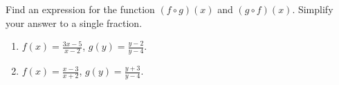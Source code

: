 Find an expression for the function $(f\circ g)(x)$ and $(g\circ f)(x)$. Simplify your answer to a single fraction. 
\begin{enumerate}
\item $\displaystyle  f(x)= \frac{3x-5}{x-2}$, $\displaystyle g(y)=\frac{y-2 }{y-4} $. 
\item $\displaystyle  f(x)= \frac{x-3}{x+2}$, $\displaystyle g(y)=\frac{y+3 }{y-4} $. 
\end{enumerate}
